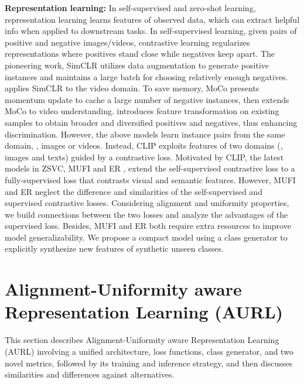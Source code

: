 \documentclass[10pt,twocolumn,letterpaper]{article}
\begin{document}
{\bf Representation learning:}
In self-supervised and zero-shot learning, representation learning learns features of observed data, which can extract helpful info when applied to downstream tasks.
In self-supervised learning, given pairs of positive and negative images/videos, contrastive learning regularizes representations where positives stand close while negatives keep apart.
The pioneering work, SimCLR \cite{chen2020simple} utilizes data augmentation to generate positive instances and maintains a large batch for choosing relatively enough negatives.
\cite{qian2021spatiotemporal} applies SimCLR to the video domain.
To save memory, MoCo \cite{he2020momentum} presents momentum update to cache a large number of negative instances, then \cite{kuang2021video, pan2021videomoco} extends MoCo to video understanding.
\cite{zhu2021improving} introduces feature transformation on existing samples to obtain broader and diversified positives and negatives, thus enhancing discrimination.
However, the above models learn instance pairs from the same domain, \eg, images or videos.
Instead, CLIP \cite{radford2021learning} exploits features of two domains (\ie, images and texts) guided by a contrastive loss.
Motivated by CLIP, the latest models in ZSVC, MUFI \cite{qiu2021boosting} and ER \cite{chen2021elaborative}, extend the self-supervised contrastive loss to a fully-supervised loss that contrasts visual and semantic features.
However, MUFI and ER neglect the difference and similarities of the self-supervised and supervised contrastive losses.
Considering alignment and uniformity properties, we build connections between the two losses and analyze the advantages of the supervised loss.
Besides, MUFI and ER both require extra resources to improve model generalizability.
We propose a compact model using a class generator to explicitly synthesize new features of synthetic unseen classes.




\section{Alignment-Uniformity aware Representation Learning (AURL)}
This section describes Alignment-Uniformity aware Representation Learning (AURL) involving a unified architecture, loss functions, class generator, and two novel metrics, followed by its training and inference strategy, and then discusses similarities and differences against alternatives.
\end{document}
